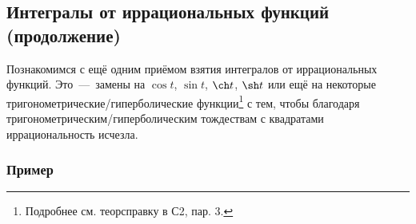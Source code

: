 \documentclass[a4paper,12pt]{article}
\begin{document}
  \subsection{Интегралы от иррациональных функций (продолжение)}

  Познакомимся с ещё одним приёмом взятия интегралов от иррациональных функций.
  Это~---~замены на $\cos t$, $\sin t$, $\ch t$, $\sh t$ или ещё на некоторые тригонометрические/гиперболические функции\footnote{  %
    Подробнее см. теорсправку в С2, пар. 3.
  } с тем, чтобы благодаря тригонометрическим/гиперболическим тождествам с квадратами иррациональность исчезла.

  \subsubsection{Пример}
  
\end{document}
